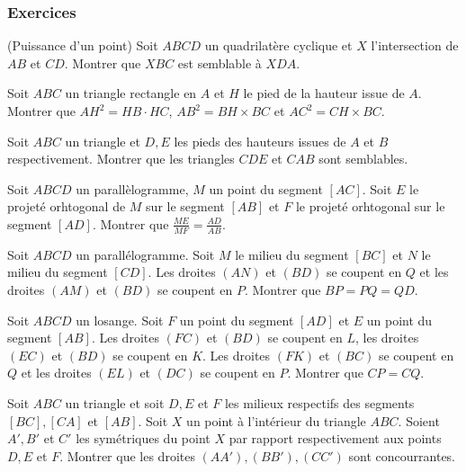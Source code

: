 
\subsubsection{Exercices}


\begin{exo}
(Puissance d'un point)
Soit $ABCD$ un quadrilatère cyclique et $X$ l’intersection de $AB$ et $CD$. Montrer que $XBC$ est semblable à $XDA$.
\end{exo}

\begin{exo}
Soit $ABC$ un triangle rectangle en $A$ et $H$ le pied de la hauteur issue de $A$. Montrer que $AH^2 = HB \cdot HC$, $AB^2=BH\times BC$ et $AC^2=CH\times BC$.
\end{exo}

\begin{exo}
Soit $ABC$ un triangle et $D,E$ les pieds des hauteurs issues de $A$ et $B$ respectivement. Montrer que les triangles $CDE$ et $CAB$ sont semblables.
\end{exo}

\begin{exo}
Soit $ABCD$ un parallèlogramme, $M$ un point du segment $[AC]$. Soit $E$ le projeté orhtogonal de $M$ sur le segment $[AB]$ et $F$ le projeté orhtogonal sur le segment $[AD]$. Montrer que $\frac{ME}{MF}=\frac{AD}{AB}$.
\end{exo}

\begin{exo}
Soit $ABCD$ un parallélogramme. Soit $M$ le milieu du segment $[BC]$ et $N$ le milieu du segment $[CD]$. Les droites $(AN)$ et $(BD)$ se coupent en $Q$ et les droites $(AM)$ et $(BD)$ se coupent en $P$. Montrer que $BP=PQ=QD$.
\end{exo}

\begin{exo}
Soit $ABCD$ un losange. Soit $F$ un point du segment $[AD]$ et $E$ un point du segment $[AB]$. Les droites $(FC)$ et $(BD)$ se coupent en $L$, les droites $(EC)$ et $(BD)$ se coupent en $K$. Les droites $(FK)$ et $(BC)$ se coupent en $Q$ et les droites $(EL)$ et $(DC)$ se coupent en $P$. Montrer que $CP=CQ$.
\end{exo}

\begin{exo}
Soit $ABC$ un triangle et soit $D,E$ et $F$ les milieux respectifs des segments $[BC], [CA]$ et $[AB]$. Soit $X$ un point à l'intérieur du triangle $ABC$. Soient $A',B'$ et $C'$ les symétriques du point $X$ par rapport respectivement aux points $D,E$ et $F$. Montrer que les droites $(AA'),(BB'),(CC')$ sont concourrantes.
\end{exo}

